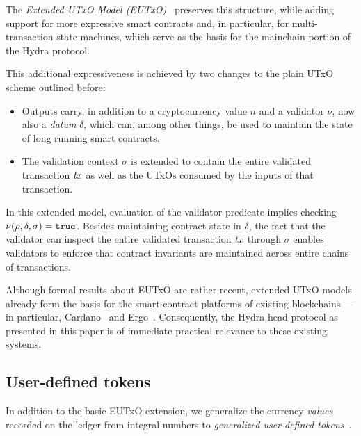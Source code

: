 \vspace{5mm} The \emph{Extended UTxO Model (EUTxO)}~\cite{eutxo} preserves this structure, while adding support for more expressive smart contracts and, in particular, for multi-transaction state machines, which serve as the basis for the mainchain portion of the Hydra protocol. 

This additional expressiveness is achieved by two changes to the plain UTxO scheme outlined before: 

\begin{itemize}
\item Outputs carry, in addition to a cryptocurrency value $n$ and a validator $\nu$, now also a \emph{datum} $\delta$, which can, among other things, be used to maintain the state of long running smart contracts.
\item The validation context $\sigma$ is extended to contain the entire validated transaction $\mathit{tx}$ as well as the UTxOs consumed by the inputs of that transaction.
\end{itemize}

In this extended model, evaluation of the validator predicate implies checking \(\nu(\rho, \delta, \sigma) = \mathtt{true}\). Besides maintaining contract state in $\delta$, the fact that the validator can inspect the entire validated transaction $\mathit{tx}$ through $\sigma$ enables validators to enforce that contract invariants are maintained across entire chains of transactions.

Although formal results about EUTxO are rather recent, extended UTxO models already form the basis for the smart-contract platforms of existing blockchains --- in particular, Cardano~\cite{plutus-platform} and Ergo~\cite{ergo-platform}. Consequently, the Hydra head protocol as presented in this paper is of immediate practical relevance to these existing systems.

\subsection{User-defined tokens}

In addition to the basic EUTxO extension, we generalize the currency \emph{values} recorded on the ledger from integral numbers to \emph{generalized user-defined tokens}~\cite{eutxo-2}.


